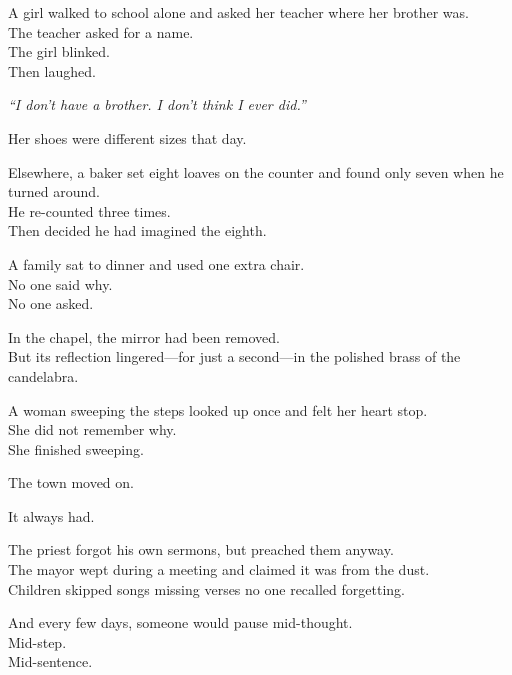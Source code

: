 \documentclass[9pt]{article}
\begin{document}
\vspace{0.5em}
A girl walked to school alone and asked her teacher where her brother was.\\
The teacher asked for a name.\\
The girl blinked.\\
Then laughed.

\vspace{0.5em}
\textit{``I don’t have a brother. I don’t think I ever did.''}

\vspace{0.5em}
Her shoes were different sizes that day.

\vspace{0.5em}
Elsewhere, a baker set eight loaves on the counter and found only seven when he turned around.\\
He re-counted three times.\\
Then decided he had imagined the eighth.

\vspace{0.5em}
A family sat to dinner and used one extra chair.\\
No one said why.\\
No one asked.

\vspace{0.5em}
In the chapel, the mirror had been removed.\\
But its reflection lingered---for just a second---in the polished brass of the candelabra.

\vspace{0.5em}
A woman sweeping the steps looked up once and felt her heart stop.\\
She did not remember why.\\
She finished sweeping.

\vspace{0.5em}
The town moved on.

\vspace{0.5em}
It always had.

\vspace{0.5em}
The priest forgot his own sermons, but preached them anyway.\\
The mayor wept during a meeting and claimed it was from the dust.\\
Children skipped songs missing verses no one recalled forgetting.

\vspace{0.5em}
And every few days, someone would pause mid-thought.\\
Mid-step.\\
Mid-sentence.
\end{document}
